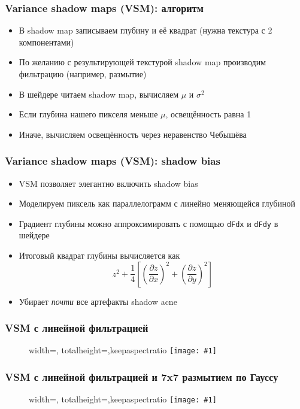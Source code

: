 \documentclass{beamer}
\newcommand{\slideimage}[1]{
  \begin{figure}
    \begin{adjustbox}{width=\textwidth, totalheight=\textheight-2\baselineskip-2\baselineskip,keepaspectratio}
      \texttt{[image: \#1]}
    \end{adjustbox}
  \end{figure}
}
\begin{document}
\begin{frame}[fragile]
\frametitle{Variance shadow maps (VSM): алгоритм}
\begin{itemize}
\item В shadow map записываем глубину и её квадрат (нужна текстура с 2 компонентами)
\pause
\item По желанию с результирующей текстурой shadow map производим фильтрацию (например, размытие)
\pause
\item В шейдере читаем shadow map, вычисляем \begin{math}\mu\end{math} и \begin{math}\sigma^2\end{math}
\pause
\item Если глубина нашего пикселя меньше \begin{math}\mu\end{math}, освещённость равна 1
\pause
\item Иначе, вычисляем освещённость через неравенство Чебышёва
\end{itemize}
\end{frame}

\begin{frame}[fragile]
\frametitle{Variance shadow maps (VSM): shadow bias}
\begin{itemize}
\item VSM позволяет элегантно включить shadow bias
\pause
\item Моделируем пиксель как параллелограмм с линейно меняющейся глубиной
\pause
\item Градиент глубины можно аппроксимировать с помощью \verb|dFdx| и \verb|dFdy| в шейдере
\pause
\item Итоговый квадрат глубины вычисляется как
\begin{equation}
z^2 + \frac{1}{4}\left[\left(\frac{\partial z}{\partial x}\right)^2 + \left(\frac{\partial z}{\partial y}\right)^2\right]
\end{equation}
\pause
\item Убирает \textit{почти} все артефакты shadow acne
\end{itemize}
\end{frame}

\begin{frame}[fragile]
\frametitle{VSM с линейной фильтрацией}
\slideimage{vsm.png}
\end{frame}

\begin{frame}[fragile]
\frametitle{VSM с линейной фильтрацией и 7x7 размытием по Гауссу}
\slideimage{vsm_gauss.png}
\end{frame}
\end{document}

